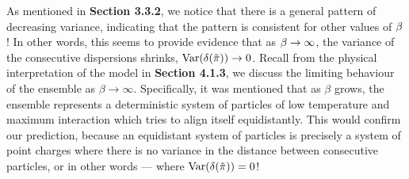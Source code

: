 
As mentioned in \textbf{Section 3.3.2}, we notice that there is a general pattern of decreasing variance, indicating that the pattern is consistent for other values of $\beta$! In other words, this seems to provide evidence that as $\beta \to \infty$, the variance of the consecutive dispersions shrinks, $\text{Var}(\delta({\tilde{\pi}})) \to 0$. Recall from the physical interpretation of the model in \textbf{Section 4.1.3}, we discuss the limiting behaviour of the ensemble as $\beta \to \infty$. Specifically, it was mentioned that as $\beta$ grows, the ensemble represents a deterministic system of particles of low temperature and maximum interaction which tries to align itself equidistantly. This would confirm our prediction, because an equidistant system of particles is precisely a system of point charges where there is no variance in the distance between consecutive particles, or in other words --- where $\text{Var}(\delta({\tilde{\pi}})) = 0$!

